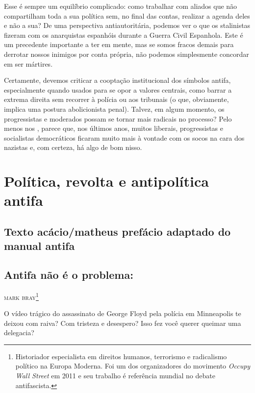 Esse é sempre um equilíbrio complicado: como trabalhar com aliados que não compartilham toda a sua política sem, no final das contas, realizar a agenda deles e não a sua? De uma perspectiva antiautoritária, podemos ver o que os stalinistas fizeram com os anarquistas espanhóis durante a Guerra Civil Espanhola. Este é um precedente importante a ter em mente, mas se somos fracos demais para derrotar nossos inimigos por conta própria, não podemos simplesmente concordar em ser mártires. 

Certamente, devemos criticar a cooptação institucional dos símbolos antifa, especialmente quando usados para se opor a valores centrais, como barrar a extrema direita sem recorrer à polícia ou aos tribunais (o que, obviamente, implica uma postura abolicionista penal). Talvez, em algum momento, os progressistas e moderados possam se tornar mais radicais no processo? Pelo menos nos , parece que, nos últimos anos, muitos liberais, progressistas e socialistas democráticos ficaram muito mais à vontade com os socos na cara dos nazistas e, com certeza, há algo de bom nisso.

\part{Política, revolta e antipolítica antifa}

\chapter{Texto acácio/matheus prefácio adaptado do manual antifa}

\lipsum[5]

\chapter*{Antifa não é o problema: }


\hfill{}\textsc{mark bray\footnote{Historiador especialista em direitos humanos, terrorismo e radicalismo político na Europa Moderna. Foi um dos organizadores do movimento \emph{Occupy Wall Street} em 2011 e seu trabalho é referência mundial no debate antifascista.}}

\bigskip

O vídeo trágico do assassinato de George Floyd pela polícia em Minneapolis te deixou com raiva? Com tristeza e desespero? Isso fez você querer queimar uma delegacia?
 

